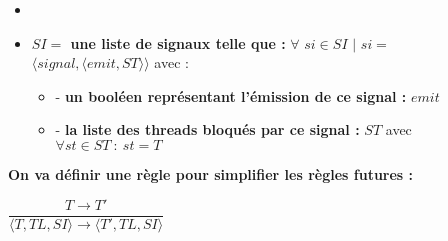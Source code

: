 \documentclass[10pt,a4paper]{report}
\begin{document}
\begin{itemize}
\begin{itemize}
\begin{itemize}
\begin{itemize}
				\end{itemize}
			\end{itemize}	
		\end{itemize}
		\item[]
		\item[] \textbf{$SI =$ une liste de signaux telle que :} $\forall$ $si \in SI$ $|$ $si =$ $\langle signal,\langle emit,ST\rangle\rangle$ avec :
		\begin{itemize}
			\item[] - \textbf{un booléen représentant l'émission de ce signal :} $emit$
			\item[] - \textbf{la liste des threads bloqués par ce signal :} $ST$ avec $\forall st \in ST~:~st = T$
		\end{itemize}
	\end{itemize}
	\bigbreak
	\bigbreak
	
	
	
	
	\textbf{On va définir une règle pour simplifier les règles futures :} 
	\begin{center}
		$\dfrac{T \rightarrow T'}{\langle T,TL,SI\rangle \rightarrow \langle T',TL,SI\rangle}$
	\end{center}
	\bigbreak
	\bigbreak
	
	
	
\end{document}
